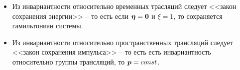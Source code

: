 \begin{example}
    \begin{itemize}
        \item Из инвариантности относительно временных трасляций следует <<закон сохранения энергии>> -- то есть если $\boldsymbol{\eta} = \boldsymbol{0}$ и $\xi = 1$, то сохраняется гамильтониан системы.
        \item Из инвариантности относительно пространственных трансляций следует <<закон сохранения импульса>> -- то есть есть инвариантность относительно группы трансляций, то $\boldsymbol{p} = const$.
    \end{itemize}
\end{example}